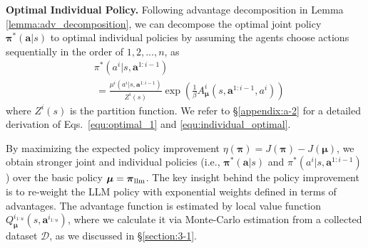\documentclass[11pt]{article}
\theoremstyle{plain}
\theoremstyle{remark}
\begin{document}
\textbf{Optimal Individual Policy.} Following advantage decomposition in Lemma \ref{lemma:adv_decomposition}, we can decompose the optimal joint policy $\boldsymbol{\pi}^{*}(\boldsymbol{a}|s)$ to optimal individual policies by assuming the agents choose actions sequentially in the order of $1, 2, ..., n$, as
\begin{align}
\label{equ:individual_optimal}
    &\pi^{*}(a^i|s, \boldsymbol{a}^{1:i-1}) \nonumber\\
    &\, = \frac{\mu^i(a^i|s,\boldsymbol{a}^{1:i-1})}{Z^{i}(s)}\exp\left(\frac{1}{\beta}A_{\boldsymbol{\mu}}^{i}(s, \boldsymbol{a}^{1:i-1}, a^i)\right)
\end{align}
where $Z^i(s)$ is the partition function. We refer to \S\ref{appendix:a-2} for a detailed derivation of Eqs.~\eqref{equ:optimal_1} and \eqref{equ:individual_optimal}.

By maximizing the expected policy improvement $\eta(\boldsymbol{\pi})=J(\boldsymbol{\pi})-J(\boldsymbol{\mu})$, we obtain stronger joint and individual policies (i.e., $\boldsymbol{\pi}^{*}(\boldsymbol{a}|s)$ and $\pi^{*}(a^i|s, \boldsymbol{a}^{1:i-1})$) over the basic policy $\boldsymbol{\mu}=\boldsymbol{\pi}_{\rm llm}$.
The key insight behind the policy improvement is to re-weight the LLM policy with exponential weights defined in terms of advantages.
The advantage function is estimated by local value function $Q_{\boldsymbol{\mu}}^{i_{1:u}}(s, \boldsymbol{a}^{i_{1:u}})$, where we calculate it via Monte-Carlo estimation from a collected dataset $\mathcal{D}$, as we discussed in \S\ref{section:3-1}. 

\end{document}
